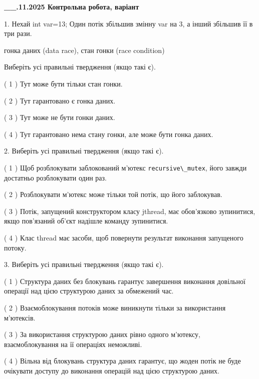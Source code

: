 \documentclass[12pt, ukrainian]{article}
\def\code#1{\Verb!#1!}
\begin{document}
\newpage
\begin {large}

\textbf{\_\_.11.2025 Контрольна робота, варіант  }\par


{
1. Нехай int var=13; Один потік збільшив змінну var на 3, а інший збільшив її в три рази.

гонка даних (data race), стан гонки (race condition)

Виберіть усі правильні твердження (якщо такі є).\par
\vspace{2mm}
( 1 ) Тут може бути тільки стан гонки.%

( 2 ) Тут гарантовано є гонка даних.%

( 3 ) Тут може не бути гонки даних.%

( 4 ) Тут гарантовано нема стану гонки, але може бути гонка даних.%


2. Виберіть усі правильні твердження (якщо такі є).\par
\vspace{2mm}

( 1 ) Щоб розблокувати заблокований м’ютекс \code{recursive\_mutex}, його завжди достатньо розблокувати один раз.%

( 2 ) Розблокувати м’ютекс може тільки той потік, що його заблокував.%

( 3 ) Потік, запущений конструктором класу jthread, має обов’язково зупинитися, якщо пов’язаний об’єкт надішле команду зупинитися.%

( 4 ) Клас thread має засоби, щоб повернути результат виконання запущеного потоку.%


3. Виберіть усі правильні твердження (якщо такі є).\par
\vspace{2mm}

( 1 ) Структура даних без блокувань гарантує завершення виконання довільної операції над цією структурою даних за обмежений час.%

( 2 ) Взаємоблокування потоків може виникнути тільки за використання м’ютексів.%

( 3 ) За використання структурою даних рівно одного м’ютексу, взаємоблокування на її операціях неможливі.%

( 4 ) Вільна від блокувань структура даних гарантує, що жоден потік не буде очікувати доступу до виконання операцій над цією структурою даних.%


}
\end{large}
\end{document}
